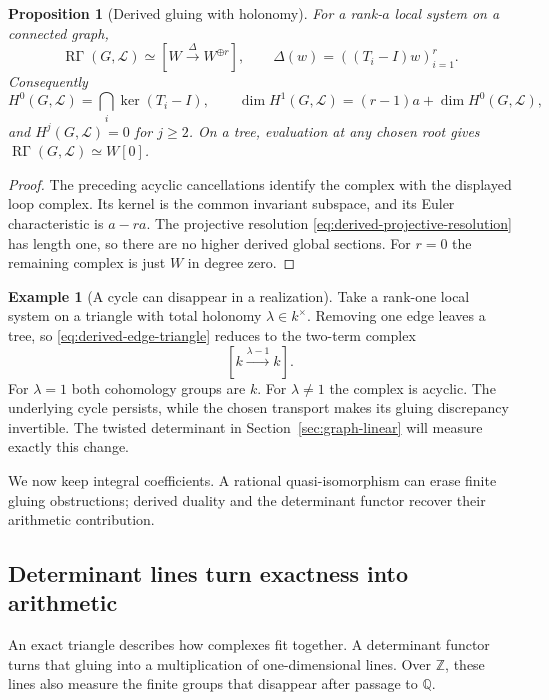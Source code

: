 \documentclass[11pt]{article}
\newtheorem{proposition}[theorem]{Proposition}
\theoremstyle{definition}
\newtheorem{example}[theorem]{Example}
\theoremstyle{remark}
\newcommand{\Q}{\mathbb Q}
\newcommand{\Z}{\mathbb Z}
\begin{document}
\begin{proposition}[Derived gluing with holonomy]\label{prop:derived-holonomy}
For a rank-$a$ local system on a connected graph,
\[
 \operatorname{R\Gamma}(G,\mathcal L)
 \simeq\left[W\xrightarrow{\Delta}W^{\oplus r}\right],
 \qquad\Delta(w)=((T_i-I)w)_{i=1}^r.
\]
Consequently
\[
 H^0(G,\mathcal L)=\bigcap_i\ker(T_i-I),\qquad
 \dim H^1(G,\mathcal L)=(r-1)a+\dim H^0(G,\mathcal L),
\]
and $H^j(G,\mathcal L)=0$ for $j\ge2$. On a tree, evaluation at any chosen root gives $\operatorname{R\Gamma}(G,\mathcal L)\simeq W[0]$.
\end{proposition}
\begin{proof}
The preceding acyclic cancellations identify the complex with the displayed loop complex. Its kernel is the common invariant subspace, and its Euler characteristic is $a-ra$. The projective resolution \eqref{eq:derived-projective-resolution} has length one, so there are no higher derived global sections. For $r=0$ the remaining complex is just $W$ in degree zero.
\end{proof}

\begin{example}[A cycle can disappear in a realization]
Take a rank-one local system on a triangle with total holonomy $\lambda\in k^\times$. Removing one edge leaves a tree, so \eqref{eq:derived-edge-triangle} reduces to the two-term complex
\[
 [k\xrightarrow{\lambda-1}k].
\]
For $\lambda=1$ both cohomology groups are $k$. For $\lambda\ne1$ the complex is acyclic. The underlying cycle persists, while the chosen transport makes its gluing discrepancy invertible. The twisted determinant in Section~\ref{sec:graph-linear} will measure exactly this change.
\end{example}

We now keep integral coefficients. A rational quasi-isomorphism can erase finite gluing obstructions; derived duality and the determinant functor recover their arithmetic contribution.


\subsection{Determinant lines turn exactness into arithmetic}
\label{sec:derived-determinant}

An exact triangle describes how complexes fit together. A determinant
functor turns that gluing into a multiplication of one-dimensional
lines. Over \(\Z\), these lines also measure the finite groups that
disappear after passage to \(\Q\).
\end{document}
